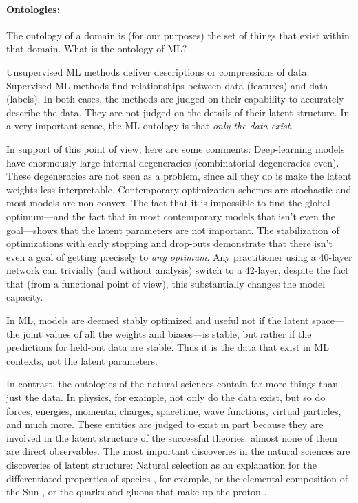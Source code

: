 \documentclass[10pt]{article}
\begin{document}
\paragraph{Ontologies:}
The ontology of a domain is (for our purposes) the set of things that exist within that domain.
What is the ontology of ML?

Unsupervised ML methods deliver descriptions or compressions of data.
Supervised ML methods find relationships between data (features) and data (labels).
In both cases, the methods are judged on their capability to accurately describe the data.
They are not judged on the details of their latent structure.
In a very important sense, the ML ontology is that \emph{only the data exist}.

In support of this point of view, here are some comments:
Deep-learning models have enormously large internal degeneracies (combinatorial degeneracies even).
These degeneracies are not seen as a problem, since all they do is make the latent weights less interpretable.
Contemporary optimization schemes are stochastic \cite{stochastic} and most models are non-convex.
The fact that it is impossible to find the global optimum---and the fact that in most contemporary models that isn't even the goal---shows that the latent parameters are not important.
The stabilization of optimizations with early stopping \cite{early_stop} and drop-outs \cite{dropout} demonstrate that there isn't even a goal of getting precisely to \emph{any optimum}.
Any practitioner using a 40-layer network can trivially (and without analysis) switch to a 42-layer, despite the fact that (from a functional point of view), this substantially changes the model capacity.

In ML, models are deemed stably optimized and useful not if the latent space---the joint values of all the weights and biases---is stable, but rather if the predictions for held-out data are stable.
Thus it is the data that exist in ML contexts, not the latent parameters.

In contrast, the ontologies of the natural sciences contain far more things than just the data.
In physics, for example, 
not only do the data exist, but so do forces, energies, momenta, charges, spacetime, wave functions, virtual particles, and much more.
These entities are judged to exist in part because they are involved in the latent structure of the successful theories; almost none of them are direct observables.
The most important discoveries in the natural sciences are discoveries of latent structure: Natural selection as an explanation for the differentiated properties of species \cite{natural_selection}, for example, or the elemental composition of the Sun \cite{sun_composition}, or the quarks and gluons that make up the proton \cite{proton_substructure}.
\end{document}
